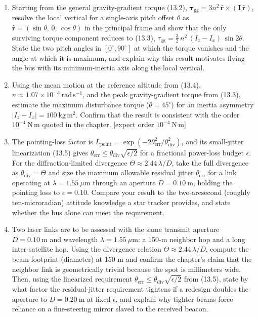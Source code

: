 \documentclass[
  11pt,
  openany,
  oneside]{book}
\begin{document}
\begin{enumerate}
\def\labelenumi{\arabic{enumi}.}
\item
  Starting from the general gravity-gradient torque (13.2),
  \(\boldsymbol{\tau}_{\mathrm{gg}} = 3 n^2\, \hat{\mathbf{r}} \times (\mathbf{I}\,\hat{\mathbf{r}})\),
  resolve the local vertical for a single-axis pitch offset \(\theta\)
  as \(\hat{\mathbf{r}} = (\sin\theta,\, 0,\, \cos\theta)\) in the
  principal frame and show that the only surviving torque component
  reduces to (13.3),
  \(\tau_{\mathrm{gg}} = \tfrac{3}{2}\, n^2\, (I_z - I_x)\, \sin 2\theta\).
  State the two pitch angles in \([0^\circ, 90^\circ]\) at which the
  torque vanishes and the angle at which it is maximum, and explain why
  this result motivates flying the bus with its minimum-inertia axis
  along the local vertical.
\item
  Using the mean motion at the reference altitude from (13.4),
  \(n \approx 1.07\times10^{-3}\ \mathrm{rad\,s^{-1}}\), and the peak
  gravity-gradient torque from (13.3), estimate the maximum disturbance
  torque (\(\theta = 45^\circ\)) for an inertia asymmetry
  \(|I_z - I_x| = 100\ \mathrm{kg\,m^2}\). Confirm that the result is
  consistent with the order \(10^{-4}\ \mathrm{N\,m}\) quoted in the
  chapter. {[}expect order \(10^{-4}\ \mathrm{N\,m}\){]}
\item
  The pointing-loss factor is
  \(L_{\mathrm{point}} = \exp(-2\theta_{\mathrm{err}}^2/\theta_{\mathrm{div}}^2)\),
  and its small-jitter linearization (13.5) gives
  \(\theta_{\mathrm{err}} \le \theta_{\mathrm{div}}\sqrt{\epsilon/2}\)
  for a fractional power-loss budget \(\epsilon\). For the
  diffraction-limited divergence \(\Theta \approx 2.44\,\lambda/D\),
  take the full divergence as \(\theta_{\mathrm{div}} = \Theta\) and
  size the maximum allowable residual jitter \(\theta_{\mathrm{err}}\)
  for a link operating at \(\lambda = 1.55\ \mu\mathrm{m}\) through an
  aperture \(D = 0.10\ \mathrm{m}\), holding the pointing loss to
  \(\epsilon = 0.10\). Compare your result to the two-arcsecond (roughly
  ten-microradian) attitude knowledge a star tracker provides, and state
  whether the bus alone can meet the requirement.
\item
  Two laser links are to be assessed with the same transmit aperture
  \(D = 0.10\ \mathrm{m}\) and wavelength
  \(\lambda = 1.55\ \mu\mathrm{m}\): a 150-m neighbor hop and a long
  inter-satellite hop. Using the divergence relation
  \(\Theta \approx 2.44\,\lambda/D\), compute the beam footprint
  (diameter) at 150 m and confirm the chapter's claim that the neighbor
  link is geometrically trivial because the spot is millimeters wide.
  Then, using the linearized requirement
  \(\theta_{\mathrm{err}} \le \theta_{\mathrm{div}}\sqrt{\epsilon/2}\)
  from (13.5), state by what factor the residual-jitter requirement
  tightens if a redesign doubles the aperture to
  \(D = 0.20\ \mathrm{m}\) at fixed \(\epsilon\), and explain why
  tighter beams force reliance on a fine-steering mirror slaved to the
  received beacon.
\end{enumerate}
\end{document}
